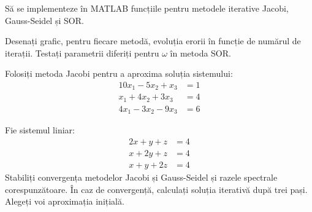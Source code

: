 \documentclass{exam}
\begin{document}
\begin{questions}
	\question Să se implementeze în MATLAB funcțiile pentru metodele iterative
	Jacobi, Gauss-Seidel și SOR.

	\question Desenați grafic, pentru fiecare metodă, evoluția erorii în funcție
	de numărul de iterații. Testați parametrii diferiți pentru $\omega$ în
	metoda SOR.

	\question Folosiți metoda Jacobi pentru a aproxima soluția sistemului:
	\begin{align*}
		10x_1 - 5x_2 + x_3  & = 1 \\
		x_1 + 4x_2 + 3 x_3  & = 4 \\
		4x_1 - 3 x_2 - 9x_3 & = 6
	\end{align*}

	\question Fie sistemul liniar:
	\begin{align*}
		2x + y + z & = 4 \\
		x + 2y + z & = 4 \\
		x + y + 2z & = 4
	\end{align*}
	Stabiliți convergența metodelor Jacobi și Gauss-Seidel și razele spectrale
	corespunzătoare. În caz de convergență, calculați soluția iterativă după
	trei pași. Alegeți voi aproximația inițială.

\end{questions}



\end{document}
